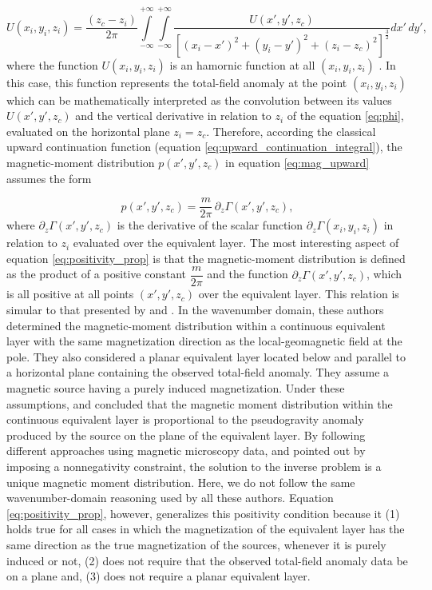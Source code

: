 \begin{equation}
U(x_i,y_i,z_i) = \dfrac{(z_c-z_i)}{2\pi} \int \limits_{-\infty}^{+\infty } \int \limits_{-\infty}^{+\infty }  \dfrac{U(x',y',z_c) }{[(x_i-x')^2 + (y_i-y')^2 + (z_i-z_c)^2]^{\frac{3}{2}}}    dx' \,dy',
\label{eq:upward_continuation_integral}
\end{equation}
where the function $U(x_i,y_i,z_i)$ is an hamornic function at all $(x_i,y_i,z_i)$ \citep{blakely1996}. In this case, this function represents the total-field anomaly at the point $(x_i,y_i,z_i)$ which can be mathematically interpreted as the convolution between its values $U(x',y',z_c)$ and the vertical derivative in relation to $z_i$ of the equation \ref{eq:phi}, evaluated on the horizontal plane $z_i =z_c$. Therefore, according the classical upward continuation function (equation \ref{eq:upward_continuation_integral}), the magnetic-moment distribution $p(x',y',z_c)$ in equation \ref{eq:mag_upward} assumes the form 

\begin{equation}
p(x',y',z_c) = \dfrac{m}{2\pi} \, \partial_{z} \Gamma(x',y',z_c) ,
\label{eq:positivity_prop}
\end{equation}
where $\partial_{z} \Gamma(x',y',z_c)$ is the derivative of the scalar function $\partial_{z} \Gamma(x_i,y_i,z_i)$ in relation to $z_i$ evaluated over the equivalent layer. The most interesting aspect of equation \ref{eq:positivity_prop} is that the magnetic-moment distribution is defined as the product of a positive constant $\dfrac{m}{2\pi}$ and the function $\partial_{z} \Gamma(x',y',z_c)$, which is all positive at all points $(x',y',z_c)$ over the equivalent layer. This relation is simular to that presented by \cite{pedersen1991} and \cite{li_etal_2014}. In the wavenumber domain, these authors determined the magnetic-moment distribution within a continuous equivalent layer with the same magnetization direction as the local-geomagnetic field at the pole. They also considered a planar equivalent layer located below and parallel to a horizontal plane containing the observed total-field anomaly. They assume a magnetic source having a purely induced magnetization. Under these assumptions, \cite{pedersen1991} and \cite{li_etal_2014} concluded that the magnetic moment distribution within the continuous equivalent layer is proportional to the pseudogravity anomaly produced by the source on the plane of the equivalent layer. By following different approaches using magnetic microscopy data, \cite{baratchart2013} and \cite{lima_weiss_2016} pointed out by imposing a nonnegativity constraint, the solution to the inverse problem is a unique magnetic moment distribution. Here, we do not follow the same wavenumber-domain reasoning used by all these authors. Equation \ref{eq:positivity_prop}, however, generalizes this positivity condition because it (1) holds true for all cases in which the magnetization of the equivalent layer has the same direction as the true
magnetization of the sources, whenever it is purely induced or not, (2) does not require that the observed total-field anomaly data be on a plane and, (3) does not require a planar equivalent layer.

